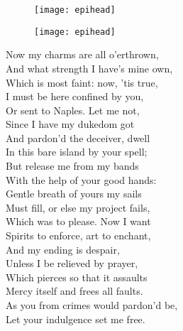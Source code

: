 \exeunt{}


\cleardoubleoddpage
\begin{letter}
	\begin{figure}[t]
		\centering
		\texttt{[image: epihead]}
	\end{figure}
\end{letter}
\begin{a4}
	\begin{figure}[t]
		\centering
		\texttt{[image: epihead]}
	\end{figure}
\end{a4}

\vfill

\begin{verse_speech}[Prospero] 
Now my charms are all o'erthrown,\\
And what strength I have's mine own,\\
Which is most faint: now, 'tis true,\\
I must be here confined by you,\\
Or sent to Naples. Let me not,\\
Since I have my dukedom got\\
And pardon'd the deceiver, dwell\\
In this bare island by your spell;\\
But release me from my bands\\
With the help of your good hands:\\
Gentle breath of yours my sails\\
Must fill, or else my project fails,\\
Which was to please. Now I want\\
Spirits to enforce, art to enchant,\\
And my ending is despair,\\
Unless I be relieved by prayer,\\
Which pierces so that it assaults\\
Mercy itself and frees all faults.\\
As you from crimes would pardon'd be,\\
Let your indulgence set me free.
\end{verse_speech}

\vfill